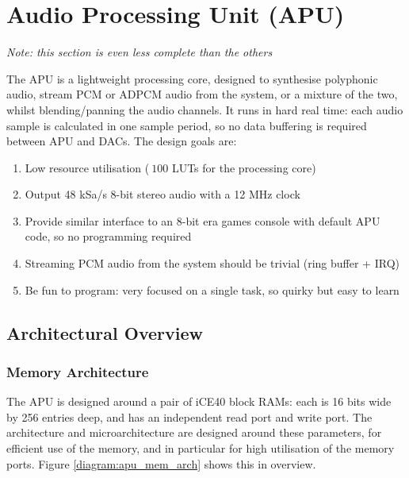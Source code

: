 \section{Audio Processing Unit (APU)}

{\it Note: this section is even less complete than the others}

The APU is a lightweight processing core, designed to synthesise polyphonic audio, stream PCM or ADPCM audio from the system, or a mixture of the two, whilst blending/panning the audio channels. It runs in hard real time: each audio sample is calculated in one sample period, so no data buffering is required between APU and DACs. The design goals are:

\begin{enumerate}
	\item Low resource utilisation ($~100$ LUTs for the processing core)
	\item Output 48 kSa/s 8-bit stereo audio with a 12 MHz clock
	\item Provide similar interface to an 8-bit era games console with default APU code, so no programming required
	\item Streaming PCM audio from the system should be trivial (ring buffer + IRQ)
	\item Be fun to program: very focused on a single task, so quirky but easy to learn
\end{enumerate}

\subsection*{Architectural Overview}

\subsubsection*{Memory Architecture}

The APU is designed around a pair of iCE40 block RAMs: each is 16 bits wide by 256 entries deep, and has an independent read port and write port. The architecture and microarchitecture are designed around these parameters, for efficient use of the memory, and in particular for high utilisation of the memory ports. Figure \ref{diagram:apu_mem_arch} shows this in overview.

